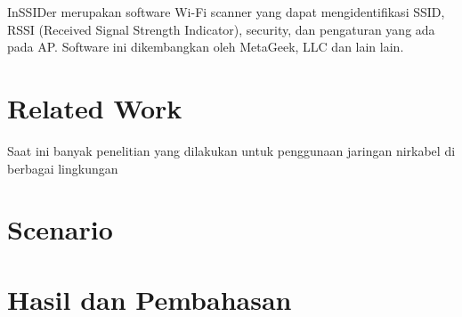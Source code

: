 \documentclass[conference]{IEEEtran}
\begin{document}
\vspace{0.2cm}

InSSIDer merupakan software Wi-Fi scanner yang dapat
mengidentifikasi SSID, RSSI (Received Signal Strength Indicator),
security, dan pengaturan yang ada pada AP. Software
ini dikembangkan oleh MetaGeek, LLC dan lain lain.


\section{Related Work}
Saat ini banyak penelitian yang dilakukan untuk penggunaan jaringan nirkabel di berbagai lingkungan
\section{Scenario}

\begin{figure}[htbp]
    
\end{figure}

\section{Hasil dan Pembahasan}
\vspace{0.2cm}
\end{document}
